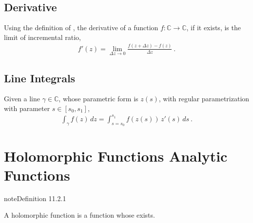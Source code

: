 \documentclass[letterpaper,10pt,english]{jupyterBook}
\begin{document}
\subsection{Derivative}
\label{\detokenize{ch/complex/analysis:derivative}}\label{\detokenize{ch/complex/analysis:complex-analysis-fun-derivative}}
\sphinxAtStartPar
Using the definition of {\hyperref[\detokenize{ch/complex/analysis:complex-analysis-fun-derivative}]{}}, the derivative of a function \(f: \mathbb{C} \rightarrow \mathbb{C}\), if it exists, is the limit of incremental ratio,
\begin{equation*}
\begin{split}f'(z) = \lim_{\Delta z \rightarrow 0} \frac{f(z + \Delta z) - f(z)}{\Delta z} \ .\end{split}
\end{equation*}

\subsection{Line Integrals}
\label{\detokenize{ch/complex/analysis:line-integrals}}\label{\detokenize{ch/complex/analysis:complex-analysis-fun-line-integral}}
\sphinxAtStartPar
Given a line \(\gamma \in \mathbb{C}\), whose parametric form is \(z(s)\), with regular parametrization with parameter \(s \in [s_0, s_1]\),
\begin{equation*}
\begin{split}\int_{\gamma} f(z) \, dz = \int_{s=s_0}^{s_1} f(z(s)) \, z'(s) \, ds \ .\end{split}
\end{equation*}

\section{Holomorphic Functions \sphinxhyphen{} Analytic Functions}
\label{\detokenize{ch/complex/analysis:holomorphic-functions-analytic-functions}}\label{\detokenize{ch/complex/analysis:complex-analysis-holo-fun}}\label{ch/complex/analysis:definition-0}
\begin{sphinxadmonition}{note}{Definition 11.2.1}



\sphinxAtStartPar
A holomorphic function is a function whose {\hyperref[\detokenize{ch/complex/analysis:complex-analysis-fun-derivative}]{}} exists.
\end{sphinxadmonition}
\end{document}
